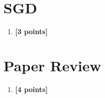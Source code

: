 \documentclass[11pt,english]{article}
\begin{document}
\section{SGD}
\begin{enumerate}[resume]

\item 
\textbf{[3 points]}


\end{enumerate}


\section{Paper Review}
\begin{enumerate}[resume]

\item 
\textbf{[4 points]}


\end{enumerate} 
\end{document}
